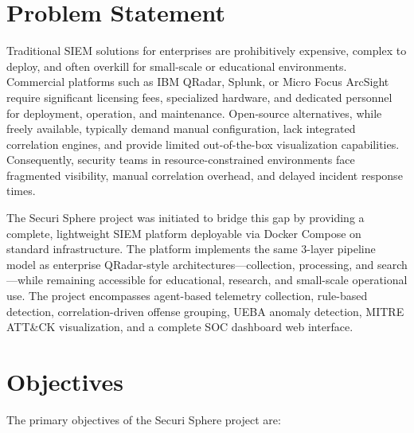 \section{Problem Statement}

Traditional SIEM solutions for enterprises are prohibitively expensive, complex to deploy, and often overkill for small-scale or educational environments. Commercial platforms such as IBM QRadar, Splunk, or Micro Focus ArcSight require significant licensing fees, specialized hardware, and dedicated personnel for deployment, operation, and maintenance. Open-source alternatives, while freely available, typically demand manual configuration, lack integrated correlation engines, and provide limited out-of-the-box visualization capabilities. Consequently, security teams in resource-constrained environments face fragmented visibility, manual correlation overhead, and delayed incident response times.

The Securi Sphere project was initiated to bridge this gap by providing a complete, lightweight SIEM platform deployable via Docker Compose on standard infrastructure. The platform implements the same 3-layer pipeline model as enterprise QRadar-style architectures—collection, processing, and search—while remaining accessible for educational, research, and small-scale operational use. The project encompasses agent-based telemetry collection, rule-based detection, correlation-driven offense grouping, UEBA anomaly detection, MITRE ATT\&CK visualization, and a complete SOC dashboard web interface.

\section{Objectives}

The primary objectives of the Securi Sphere project are:

